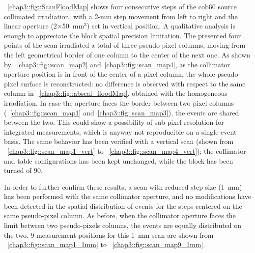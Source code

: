 \figurename~\ref{chap3::fig::ScanFloodMap} shows four consecutive steps of the \gls{cob60} source collimated irradiation, with a 2-mm step movement from left to right and the linear aperture (2$\times$50~mm$^2$) set in vertical position. A qualitative analysis is enough to appreciate the block spatial precision limitation. The presented four points of the scan irradiated a total of three pseudo-pixel columns, moving from the left geometrical border of one column to the center of the next one. As shown by \figurename~\ref{chap3::fig::scan_map2} and~\ref{chap3::fig::scan_map4}, as the collimator aperture position is in front of the center of a pixel column, the whole pseudo-pixel surface is reconstructed: no difference is observed with respect to the same column in \figurename~\ref{chap3::fig::abscal_floodMap}, obtained with the homogeneous irradiation. In case the aperture faces the border between two pixel columns (\figurename~\ref{chap3::fig::scan_map1} and~\ref{chap3::fig::scan_map3}), the events are shared between the two. This could show a possibility of sub-pixel resolution for integrated measurements, which is anyway not reproducible on a single event basis. The same behavior has been verified with a vertical scan (shown from \figurename~\ref{chap3::fig::scan_map1_vert} to \figurename~\ref{chap3::fig::scan_map4_vert}); the collimator and table configurations has been kept unchanged, while the block has been turned of 90\textdegree.

In order to further confirm these results, a scan with reduced step size (1~mm) has been performed with the same collimator aperture, and no modifications have been detected in the spatial distribution of events for the steps centered on the same pseudo-pixel column. As before, when the collimator aperture faces the limit between two pseudo-pixels columns, the events are equally distributed on the two. 9 measurement positions for this 1~mm scan are shown from \figurename~\ref{chap3::fig::scan_map1_1mm} to \figurename~\ref{chap3::fig::scan_map9_1mm}.
 

